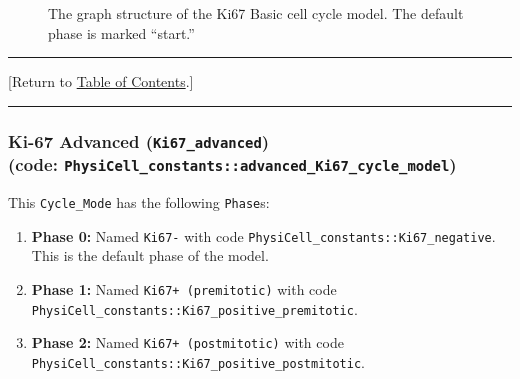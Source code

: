 \documentclass[12pt]{article}
\renewcommand{\v}{\verb}
\newcommand{\TOClink}{\begin{center}\hrule\vskip-5pt\phantom{.}\hfill[Return to \hyperlink{TOC}{Table of Contents}.]\hfill\phantom{.}\vskip3pt\hrule\end{center}}
\begin{document}
\begin{figure}
\begin{mdframed}[style=mystyle]
\caption{The graph structure of the Ki67 Basic cell cycle model. The default phase is marked 
``start.''}
\label{fig:cycle_model:ki67_basic}
\end{mdframed}
\end{figure}

\TOClink 

\subsubsection{Ki-67 Advanced (\texttt{Ki67\_advanced})\\
(code: \texttt{PhysiCell\_constants::advanced\_Ki67\_cycle\_model})}
\label{sec:Standard_Models:Ki67_Advanced}
This \v|Cycle_Mode| has the following \v|Phase|s: 
\begin{enumerate}
\item 
\textbf{Phase 0:} Named \v|Ki67-| with code \v|PhysiCell_constants::Ki67_negative|. This is the default 
phase of the model. 

\item 
\textbf{Phase 1:} Named \v|Ki67+ (premitotic)| with code \\ \v|PhysiCell_constants::Ki67_positive_premitotic|. 

\item 
\textbf{Phase 2:} Named \v|Ki67+ (postmitotic)| with code \\ \v|PhysiCell_constants::Ki67_positive_postmitotic|. 

\end{enumerate}
\end{document}
